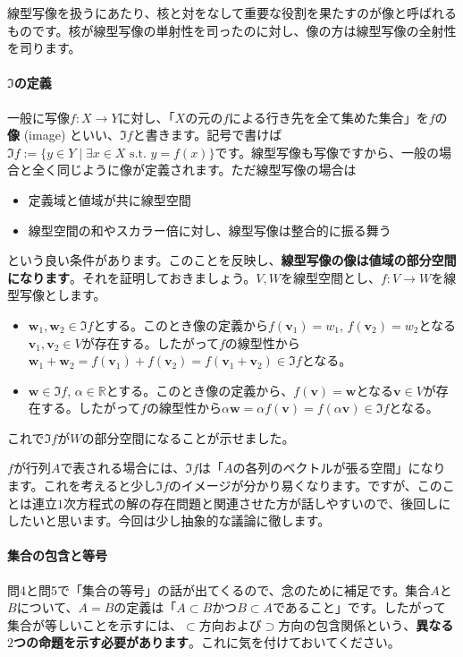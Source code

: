 線型写像を扱うにあたり、核と対をなして重要な役割を果たすのが像と呼ばれるものです。核が線型写像の単射性を司ったのに対し、像の方は線型写像の全射性を司ります。

\paragraph{$\Im$の定義}

一般に写像$f\colon X\rightarrow Y$に対し、「$X$の元の$f$による行き先を全て集めた集合」を$f$の\textbf{像} (image) といい、$\Im f$と書きます。記号で書けば$\Im f := \{y \in Y \mid \exists x\in X \text{ s.t. } y = f(x)\}$です。線型写像も写像ですから、一般の場合と全く同じように像が定義されます。ただ線型写像の場合は
\begin{itemize}
\item 定義域と値域が共に線型空間
\item 線型空間の和やスカラー倍に対し、線型写像は整合的に振る舞う
\end{itemize}
という良い条件があります。このことを反映し、\textbf{線型写像の像は値域の部分空間になります}。それを証明しておきましょう。$V, W$を線型空間とし、$f\colon V\rightarrow W$を線型写像とします。
\begin{itemize}
\item $\bm{w}_1, \bm{w}_2\in \Im f$とする。このとき像の定義から$f(\bm{v}_1) = w_1$, $f(\bm{v}_2) = w_2$となる$\bm{v}_1, \bm{v}_2\in V$が存在する。したがって$f$の線型性から$\bm{w}_1 + \bm{w}_2 = f(\bm{v}_1) + f(\bm{v}_2) = f(\bm{v}_1 + \bm{v}_2) \in \Im f$となる。
\item $\bm{w}\in \Im f$, $\alpha\in\mathbb{R}$とする。このとき像の定義から、$f(\bm{v}) = \bm{w}$となる$\bm{v} \in V$が存在する。したがって$f$の線型性から$\alpha \bm{w} = \alpha f(\bm{v}) = f(\alpha \bm{v}) \in \Im f$となる。
\end{itemize}
これで$\Im f$が$W$の部分空間になることが示せました。

$f$が行列$A$で表される場合には、$\Im f$は「$A$の各列のベクトルが張る空間」になります。これを考えると少し$\Im f$のイメージが分かり易くなります。ですが、このことは連立$1$次方程式の解の存在問題と関連させた方が話しやすいので、後回しにしたいと思います。今回は少し抽象的な議論に徹します。

\paragraph{集合の包含と等号}

問4と問5で「集合の等号」の話が出てくるので、念のために補足です。集合$A$と$B$について、$A=B$の定義は「$A\subset B$かつ$B\subset A$であること」です。したがって集合が等しいことを示すには、$\subset$方向および$\supset$方向の包含関係という、\textbf{異なる$2$つの命題を示す必要があります}。これに気を付けておいてください。

